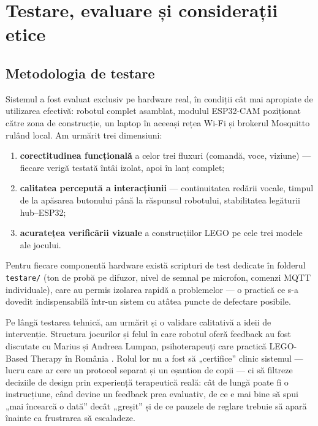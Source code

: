 \chapter{Testare, evaluare și considerații etice}
\label{cap:evaluare}

\section{Metodologia de testare}

Sistemul a fost evaluat exclusiv pe hardware real, în condiții cât mai apropiate de utilizarea efectivă: robotul complet asamblat, modulul ESP32-CAM poziționat către zona de construcție, un laptop în aceeași rețea Wi-Fi și brokerul Mosquitto rulând local. Am urmărit trei dimensiuni:

\begin{enumerate}
    \item \textbf{corectitudinea funcțională} a celor trei fluxuri (comandă, voce, viziune) — fiecare verigă testată întâi izolat, apoi în lanț complet;
    \item \textbf{calitatea percepută a interacțiunii} — continuitatea redării vocale, timpul de la apăsarea butonului până la răspunsul robotului, stabilitatea legăturii hub--ESP32;
    \item \textbf{acuratețea verificării vizuale} a construcțiilor LEGO pe cele trei modele ale jocului.
\end{enumerate}

Pentru fiecare componentă hardware există scripturi de test dedicate în folderul \texttt{testare/} (ton de probă pe difuzor, nivel de semnal pe microfon, comenzi MQTT individuale), care au permis izolarea rapidă a problemelor — o practică ce s-a dovedit indispensabilă într-un sistem cu atâtea puncte de defectare posibile.

Pe lângă testarea tehnică, am urmărit și o validare calitativă a ideii de intervenție. Structura jocurilor și felul în care robotul oferă feedback au fost discutate cu Marius și Andreea Lumpan, psihoterapeuți care practică LEGO-Based Therapy în România \cite{lumpanagerpres2025}. Rolul lor nu a fost să „certifice” clinic sistemul — lucru care ar cere un protocol separat și un eșantion de copii — ci să filtreze deciziile de design prin experiență terapeutică reală: cât de lungă poate fi o instrucțiune, când devine un feedback prea evaluativ, de ce e mai bine să spui „mai încearcă o dată” decât „greșit” și de ce pauzele de reglare trebuie să apară înainte ca frustrarea să escaladeze.

